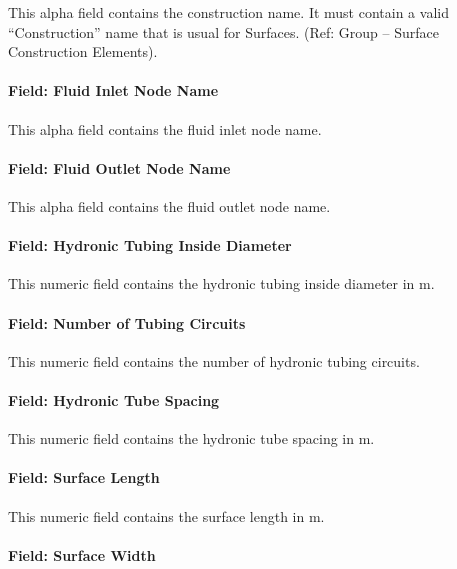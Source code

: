 This alpha field contains the construction name. It must contain a valid ``Construction'' name that is usual for Surfaces. (Ref: Group -- Surface Construction Elements).

\paragraph{Field: Fluid Inlet Node Name}\label{field-fluid-inlet-node-name-1}

This alpha field contains the fluid inlet node name.

\paragraph{Field: Fluid Outlet Node Name}\label{field-fluid-outlet-node-name-1}

This alpha field contains the fluid outlet node name.

\paragraph{Field: Hydronic Tubing Inside Diameter}\label{field-hydronic-tubing-inside-diameter-1}

This numeric field contains the hydronic tubing inside diameter in m.

\paragraph{Field: Number of Tubing Circuits}\label{field-number-of-tubing-circuits-1}

This numeric field contains the number of hydronic tubing circuits.

\paragraph{Field: Hydronic Tube Spacing}\label{field-hydronic-tube-spacing}

This numeric field contains the hydronic tube spacing in m.

\paragraph{Field: Surface Length}\label{field-surface-length}

This numeric field contains the surface length in m.

\paragraph{Field: Surface Width}\label{field-surface-width}

